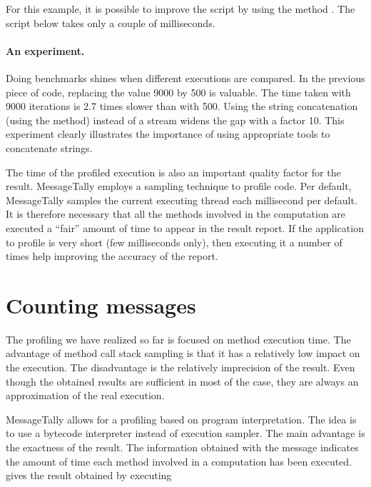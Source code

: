 \documentclass[a4paper,10pt,twoside]{book}
\begin{document}
For this example, it is possible to improve the script by using the method . The script below takes only a couple of milliseconds.
 

\paragraph{An experiment.}
Doing benchmarks shines when different executions are compared. In the previous piece of code, replacing the value 9000 by 500 is  valuable. The time taken with 9000 iterations is 2.7 times slower than with 500. Using the string concatenation (\ie using the \ct{,} method) instead of a stream widens the gap with a factor 10. This experiment clearly illustrates the importance of using appropriate tools to concatenate strings.

The time of the profiled execution is also an important quality factor for the result. MessageTally employs a sampling technique to profile code. Per default, MessageTally samples the current executing thread each millisecond per default. It is therefore necessary that all the methods involved in the computation are executed a ``fair'' amount of time to appear in the result report. If the application to profile is very short (few milliseconds only), then executing it a  number of times help improving the accuracy of the report. 



\section{Counting messages}
The profiling we have realized so far is focused on method execution time. The advantage of method call stack sampling is that it has a relatively low impact on the execution. The disadvantage is the relatively imprecision of the result. Even though the obtained results are sufficient in most of the case, they are always an approximation of the real execution.

MessageTally allows for a profiling based on program interpretation. The idea is to use a bytecode interpreter instead of execution sampler. The main advantage is the exactness of the result. The information obtained with the message  indicates the amount of time each method involved in a computation has been executed.  gives the result obtained by executing 
\end{document}

